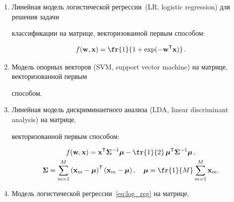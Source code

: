 \begin{enumerate}

    \item Линейная модель логистической регрессии~(LR, logistic regression) для решения задачи 

классификации на матрице, векторизованной первым способом: %

        \begin{equation}

            f(\mathbf{w},\mathbf{x})=\fr{1}{1+\text{exp}(-\mathbf{w}^\mathsf{T}\mathbf{x})}\,.

            \label{eq:log_reg}

        \end{equation}

    \item Модель опорных векторов (SVM, support vector machine) на матрице, векторизованной первым 

способом.




    \item Линейная модель дискриминантного анализа (LDA, linear discriminant analysis) на матрице, 

векторизованной первым способом:

       \begin{multline*}

            f(\mathbf{w}, \mathbf{x}) = \mathbf{x}^\mathsf{T}\boldsymbol{\Sigma}^{-1} \boldsymbol{\mu} - 

\fr{1}{2}\,\boldsymbol{\mu}^\mathsf{T}\boldsymbol{\Sigma}^{-1}\boldsymbol{\mu}\,,


      \\

        \boldsymbol{\Sigma}=\sum\limits_{m=1}^{M}\left(\mathbf{x}_m-

\boldsymbol{\mu}\right)^\mathsf{T}

        \left(\mathbf{x}_m-\boldsymbol{\mu}\right), \quad \boldsymbol{\mu}=\fr{1}{M} 

\sum\limits_{m=1}^{M} \mathbf{x}_m.

 \end{multline*}

      \item  Модель логистической регрессии~\eqref{eq:log_reg}  на матрице, 


\end{enumerate}
